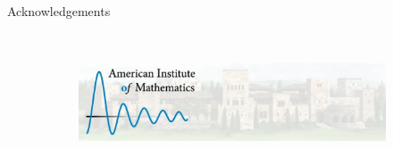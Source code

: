 \documentclass[aspectratio=169]{beamer}
\begin{document}
\begin{frame}{Acknowledgements}
\begin{figure}
\begin{subfigure}[b]{0.23\textwidth}
     \end{subfigure}
     \\
     \vspace*{1cm}
     \begin{subfigure}[b]{0.7\textwidth}
         \centering
         \includegraphics[width=\textwidth]{figures/aim_logo.jpg}
     \end{subfigure}
\end{figure}
\vfill
\end{frame}
\end{document}
